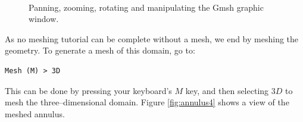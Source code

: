 \begin{figure}[htbp!]
  \centering
  \\
  \caption{Panning, zooming, rotating and manipulating the Gmsh graphic window.}
  \label{fig:animals}
\end{figure}
\par
As no meshing tutorial can be complete without a mesh, we end by meshing the geometry. To generate a mesh of this domain, go to:
\begin{lstlisting}
Mesh (M) > 3D
\end{lstlisting}
This can be done by pressing your keyboard's $M$ key, and then selecting $3D$ to mesh the three--dimensional domain. Figure \ref{fig:annulus4} shows a view of the meshed annulus.

